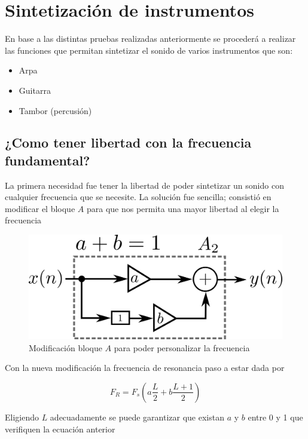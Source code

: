 \documentclass[assd_tp2_main.tex]{subfiles}
\begin{document}
\section{Sintetización de instrumentos}

En base a las distintas pruebas realizadas anteriormente se procederá a realizar las funciones que permitan sintetizar el sonido de varios instrumentos que son:
\begin{itemize}
	\item Arpa
	\item Guitarra
	\item Tambor (percusión)
\end{itemize}

\subsection{¿Como tener libertad con la frecuencia fundamental?}

La primera necesidad fue tener la libertad de poder sintetizar un sonido con cualquier frecuencia que se necesite. La solución fue sencilla; consistió en modificar el bloque $A$ para que nos permita una mayor libertad al elegir la frecuencia
\begin{figure}[H]
	\begin{center}
	\includegraphics[scale=1]{graficos/bloque4ej5.png}
	\caption{Modificación bloque $A$ para poder personalizar la frecuencia}

	\end{center}
\end{figure}

Con la nueva modificación la frecuencia de resonancia paso a estar dada por

\begin{equation}
	F_R=F_s(a\frac{L}{2}+b\frac{L+1}{2})
\end{equation}

Eligiendo $L$ adecuadamente se puede garantizar que existan $a$ y $b$ entre 0 y 1 que verifiquen la ecuación anterior
\end{document}
